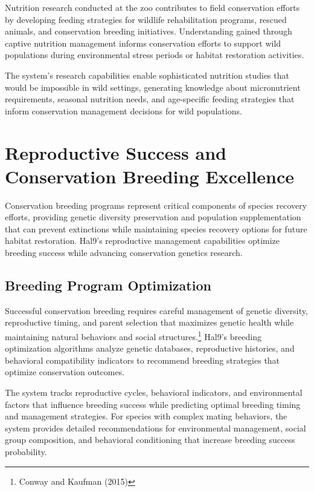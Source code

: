 \documentclass[
  Letterpaper,
]{scrbook}
\begin{document}
Nutrition research conducted at the zoo contributes to field
conservation efforts by developing feeding strategies for wildlife
rehabilitation programs, rescued animals, and conservation breeding
initiatives. Understanding gained through captive nutrition management
informs conservation efforts to support wild populations during
environmental stress periods or habitat restoration activities.

The system's research capabilities enable sophisticated nutrition
studies that would be impossible in wild settings, generating knowledge
about micronutrient requirements, seasonal nutrition needs, and
age-specific feeding strategies that inform conservation management
decisions for wild populations.

\section{Reproductive Success and Conservation Breeding
Excellence}\label{reproductive-success-and-conservation-breeding-excellence}

Conservation breeding programs represent critical components of species
recovery efforts, providing genetic diversity preservation and
population supplementation that can prevent extinctions while
maintaining species recovery options for future habitat restoration.
Hal9's reproductive management capabilities optimize breeding success
while advancing conservation genetics research.

\subsection{Breeding Program
Optimization}\label{breeding-program-optimization}

Successful conservation breeding requires careful management of genetic
diversity, reproductive timing, and parent selection that maximizes
genetic health while maintaining natural behaviors and social
structures.\footnote{Conway and Kaufman (2015)} Hal9's breeding
optimization algorithms analyze genetic databases, reproductive
histories, and behavioral compatibility indicators to recommend breeding
strategies that optimize conservation outcomes.

The system tracks reproductive cycles, behavioral indicators, and
environmental factors that influence breeding success while predicting
optimal breeding timing and management strategies. For species with
complex mating behaviors, the system provides detailed recommendations
for environmental management, social group composition, and behavioral
conditioning that increase breeding success probability.
\end{document}

